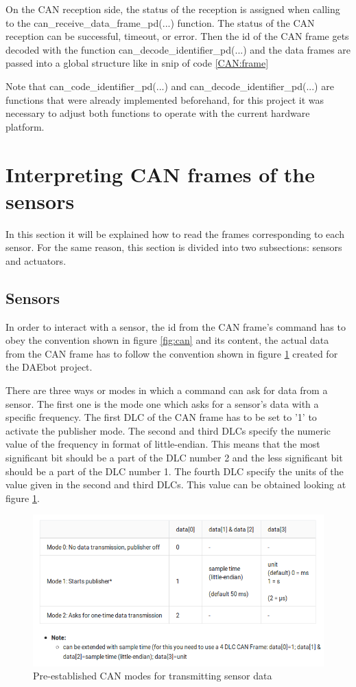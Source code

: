 \documentclass[12pt]{report}%
\begin{document}
On the CAN reception side, the status of the reception is assigned when calling to the can\_receive\_data\_frame\_pd(...) function. The status of the CAN reception can be successful, timeout, or error. Then the id of the CAN frame gets decoded with the function can\_decode\_identifier\_pd(...) and the data frames are passed into a global structure like in snip of code \ref{CAN:frame}

Note that can\_code\_identifier\_pd(...) and can\_decode\_identifier\_pd(...) are functions that were already implemented beforehand, for this project it was necessary to adjust both functions to operate with the current hardware platform.

\section{Interpreting CAN frames of the sensors}
\label{sec:sensorout}
In this section it will be explained how to read the frames corresponding to each sensor. For the same reason, this section is divided into two subsections: sensors and actuators.

\subsection{Sensors}
\label{sub:sensors}
In order to interact with a sensor, the id from the CAN frame's command has to obey the convention shown in figure \ref{fig:can} and its content, the actual data from the CAN frame has to follow the convention shown in figure  \ref{fig:sensormodes} created for the DAEbot project.

There are three ways or modes in which a command can ask for data from a sensor. The first one is the mode one which asks for a sensor's data with a specific frequency. The first DLC of the CAN frame has to be set to '1' to activate the publisher mode. The second and third DLCs specify the numeric value of the frequency in format of little-endian. This means that the most significant bit should be a part of the DLC number 2 and the less significant bit should be a part of the DLC number 1. The fourth DLC specify the units of the value given in the second and third DLCs. This value can be obtained looking at figure \ref{fig:sensormodes}.

\begin{figure}[ht]
	\centering
	\includegraphics[width=\textwidth]{modes}
    \caption{Pre-established CAN modes for transmitting sensor data \cite{DAEbot_Wiki}}
    \label{fig:sensormodes}
\end{figure}
\end{document}
